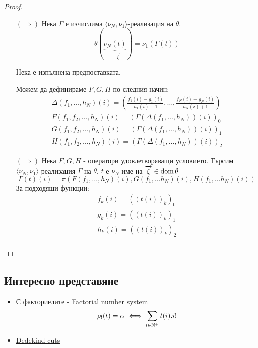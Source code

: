 \begin{proof}
    \begin{itemize}
        \item[$(\Rightarrow)$] Нека $\Gamma$ е изчислима $\langle \nu_N, \nu_1\rangle$-реализация на $\theta$.
        \begin{equation}
            \theta(\underbrace{\nu_N(t)}_{=\overrightarrow\xi}) = \nu_1(\Gamma(t))
        \end{equation}
        
        Нека е изпълнена предпоставката.
        
        Можем да дефинираме $F, G, H$ по следния начин:
        \begin{equation}
            \begin{split}
                \Delta(f_1, \dots, h_N)(i) = \left(\frac{f_1(i) - g_1(i)}{h_1(i) + 1}, \dots, \frac{f_N(i) - g_N(i)}{h_N(i) + 1}\right)\\
                F(f_1, f_2, \dots, h_N)(i) = (\Gamma (\Delta(f_1, \dots, h_N))(i))_0 \\
                G(f_1, f_2, \dots, h_N)(i) = (\Gamma (\Delta(f_1, \dots, h_N))(i))_1 \\ 
                H(f_1, f_2, \dots, h_N)(i) = (\Gamma (\Delta(f_1, \dots, h_N))(i))_2
            \end{split}
        \end{equation}
        \item[$(\Rightarrow)$] Нека $F, G, H$ - оператори удовлетворяващи условието. Търсим $\langle \nu_N, \nu_1 \rangle$-реализация $\Gamma$ на $\theta$. $t$ е $\nu_N$-име на $\overrightarrow\xi \in \operatorname*{dom}\theta$
        \begin{equation}
            \Gamma(t)(i) = \pi(F(f_1, \dots, h_N)(i), G(f_1, \dots h_N)(i), H(f_1, \dots h_N)(i))
        \end{equation}
        За подходящи функции:
        \begin{equation}
            \begin{split}
                f_k(i) = ((t(i))_k)_0 \\
                g_k(i) = ((t(i))_k)_1 \\
                h_k(i) = ((t(i))_k)_2 \\
            \end{split}
        \end{equation}
    \end{itemize}
\end{proof}

\subsection{Интересно представяне}
\begin{itemize}
    \item С факториелите - \href{https://en.wikipedia.org/wiki/Factorial_number_system}{Factorial number system}
    \begin{equation}
        \rho_!(t) = \alpha \iff \sum_{i\in{\mathbb{N}}^+} t(i).i!
    \end{equation}
    \item \href{https://en.wikipedia.org/wiki/Dedekind_cut}{Dedekind cuts}
\end{itemize}

